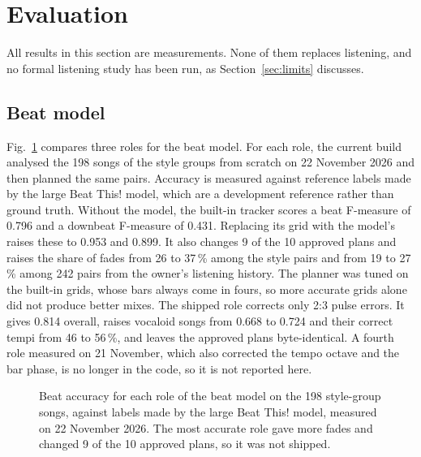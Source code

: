 \documentclass[conference,a4paper]{IEEEtran}
\begin{document}
\section{Evaluation}\label{sec:evaluation}

All results in this section are measurements. None of them replaces listening, and no formal
listening study has been run, as Section~\ref{sec:limits} discusses.

\subsection{Beat model}
Fig.~\ref{fig:beat} compares three roles for the beat model. For each role, the current build
analysed the 198 songs of the style groups from scratch on 22 November 2026 and then planned the
same pairs. Accuracy is measured against reference labels made by the large Beat This! model, which
are a development reference rather than ground truth. Without the model, the built-in tracker
scores a beat F-measure of 0.796 and a downbeat F-measure of 0.431. Replacing its grid with the
model's raises these to 0.953 and 0.899. It also changes 9 of the 10 approved plans and raises the
share of fades from 26 to 37\,\% among the style pairs and from 19 to 27\,\% among 242 pairs
from the owner's listening history. The planner was tuned on the built-in grids, whose bars always
come in fours, so more accurate grids alone did not produce better mixes. The shipped role
corrects only 2:3 pulse errors. It gives 0.814 overall, raises vocaloid songs from 0.668 to 0.724
and their correct tempi from 46 to 56\,\%, and leaves the approved plans byte-identical. A fourth
role measured on 21 November, which also corrected the tempo octave and the bar phase, is no longer
in the code, so it is not reported here.

\begin{figure}[t]
\centering
{}
\caption{Beat accuracy for each role of the beat model on the 198 style-group songs, against
labels made by the large Beat This! model, measured on 22 November 2026. The most accurate role gave
more fades and changed 9 of the 10 approved plans, so it was not shipped.}
\label{fig:beat}
\end{figure}
\end{document}
